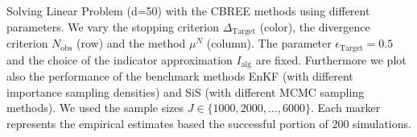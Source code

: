 Solving Linear Problem (d=50) with the CBREE methods using      different parameters.     We vary the stopping criterion $\Delta_{\text{Target}}$ (color),     the divergence criterion $N_\text{obs}$ (row) and     the method $\mu^N$ (column).     The parameter $\epsilon_{\text{Target}} = 0.5$     and the choice of the indicator approximation $I_\text{alg}$     are fixed.     Furthermore we plot also the performance of the benchmark methods EnKF    (with different importance sampling densities)    and SiS (with different MCMC sampling methods).     We used the sample sizes $J \in \{1000, 2000, \ldots, 6000\}$.     Each marker represents the empirical estimates based the successful portion of $200$ simulations.